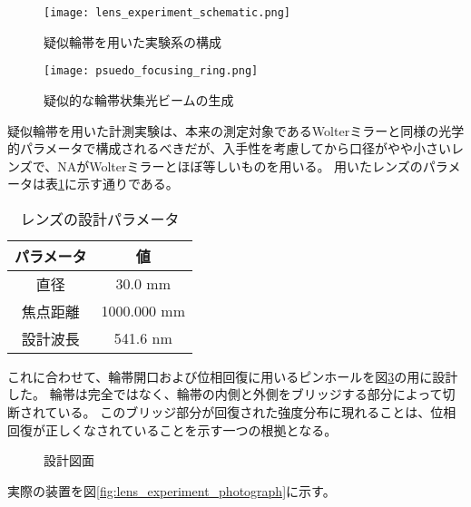 \begin{figure}[!ht]
\centering
\texttt{[image: lens\_experiment\_schematic.png]}
\caption{疑似輪帯を用いた実験系の構成}
\label{fig:lens_experiment_schematic}
\end{figure}


\begin{figure}[!ht]
\centering
\texttt{[image: psuedo\_focusing\_ring.png]}
\caption{疑似的な輪帯状集光ビームの生成}
\label{fig:psuedo_focusing_ring_model}
\end{figure}

疑似輪帯を用いた計測実験は、本来の測定対象であるWolterミラーと同様の光学的パラメータで構成されるべきだが、入手性を考慮してから口径がやや小さいレンズで、NAがWolterミラーとほぼ等しいものを用いる。
用いたレンズのパラメータは表\ref{tb:focusing_lens_params}に示す通りである。

\begin{table}[h]
\begin{center}
  \begin{tabular}{|c|c|} \hline
    パラメータ & 値 \\ \hline
    直径 & 30.0 mm  \\
    焦点距離 & 1000.000 mm \\
    設計波長 & 541.6 nm \\ \hline
  \end{tabular}
  \caption{レンズの設計パラメータ}
  \label{tb:focusing_lens_params}
\end{center}
\end{table}

これに合わせて、輪帯開口および位相回復に用いるピンホールを図\ref{fig:lens_pinhole_ring_aperture}の用に設計した。
輪帯は完全ではなく、輪帯の内側と外側をブリッジする部分によって切断されている。
このブリッジ部分が回復された強度分布に現れることは、位相回復が正しくなされていることを示す一つの根拠となる。

\begin{figure}[!ht]
\centering

\caption[]{設計図面}
\label{fig:lens_pinhole_ring_aperture}
\end{figure}

実際の装置を図\ref{fig:lens_experiment_photograph}に示す。

